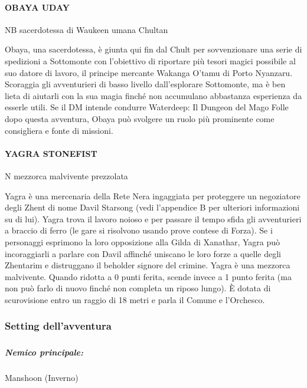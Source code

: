 \documentclass{article}
\begin{document}
                \paragraph{OBAYA UDAY}
NB sacerdotessa di Waukeen umana Chultan

Obaya, una sacerdotessa, è giunta qui fin dal Chult per sovvenzionare una serie di spedizioni a Sottomonte con l’obiettivo di riportare più tesori magici possibile al suo datore di lavoro, il principe mercante Wakanga O’tamu di Porto Nyanzaru. Scoraggia gli avventurieri di basso livello dall’esplorare Sottomonte, ma è ben lieta di aiutarli con la sua magia finché non accumulano abbastanza esperienza da esserle utili. Se il DM intende condurre Waterdeep: Il Dungeon del Mago Folle dopo questa avventura, Obaya può svolgere un ruolo più prominente come consigliera e fonte di missioni.

                \paragraph{YAGRA STONEFIST}
N mezzorca malvivente prezzolata

Yagra è una mercenaria della Rete Nera ingaggiata per proteggere un negoziatore degli Zhent di nome Davil Starsong (vedi l'appendice B per ulteriori informazioni su di lui). Yagra trova il lavoro noioso e per passare il tempo sfida gli avventurieri a braccio di ferro (le gare si risolvono usando prove contese di Forza). Se i personaggi esprimono la loro opposizione alla Gilda di Xanathar, Yagra può incoraggiarli a parlare con Davil affinché uniscano le loro forze a quelle degli Zhentarim e distruggano il beholder signore del crimine. Yagra è una mezzorca malvivente. Quando ridotta a 0 punti ferita, scende invece a 1 punto ferita (ma non può farlo di nuovo finché non completa un riposo lungo). È dotata di scurovisione entro un raggio di 18 metri e parla il Comune e l'Orchesco.

            \subsubsection{Setting dell'avventura}
                        \subparagraph{}

                        \subparagraph{Nemico principale: } Manshoon (Inverno)
\end{document}
